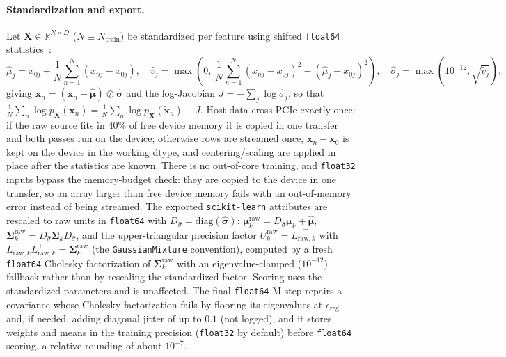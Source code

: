\documentclass[10pt]{article} %
\newcommand{\R}{\mathbb{R}}
\newcommand{\diag}{\mathrm{diag}}
\begin{document}
\paragraph{Standardization and export.} Let $\mathbf{X} \in \R^{N \times D}$ ($N \equiv N_{\mathrm{train}}$) be standardized per feature using shifted \texttt{float64} statistics~\citep{chan1983updating}:
\[
\hat{\mu}_j = x_{0j} + \frac{1}{N}\sum_{n=1}^N (x_{nj} - x_{0j}), \quad
\hat{v}_j = \max\!\left(0,\, \frac{1}{N}\sum_{n=1}^N (x_{nj} - x_{0j})^2 - (\hat{\mu}_j - x_{0j})^2\right), \quad
\hat{\sigma}_j = \max\!\left(10^{-12}, \sqrt{\hat{v}_j}\right),
\]
giving $\tilde{\mathbf{x}}_n = (\mathbf{x}_n - \hat{\boldsymbol{\mu}}) \oslash \hat{\boldsymbol{\sigma}}$ and the log-Jacobian $J = -\sum_{j} \log \hat{\sigma}_j$, so that $\frac{1}{N}\sum_n \log p_{\mathbf{X}}(\mathbf{x}_n) = \frac{1}{N}\sum_n \log p_{\tilde{\mathbf{X}}}(\tilde{\mathbf{x}}_n) + J$. Host data cross PCIe exactly once: if the raw source fits in $40\%$ of free device memory it is copied in one transfer and both passes run on the device; otherwise rows are streamed once, $\mathbf{x}_n - \mathbf{x}_0$ is kept on the device in the working dtype, and centering/scaling are applied in place after the statistics are known. There is no out-of-core training, and \texttt{float32} inputs bypass the memory-budget check: they are copied to the device in one transfer, so an array larger than free device memory fails with an out-of-memory error instead of being streamed. The exported \texttt{scikit-learn} attributes are rescaled to raw units in \texttt{float64} with $D_{\hat{\sigma}} = \diag(\hat{\boldsymbol{\sigma}})$: $\boldsymbol{\mu}_k^{\mathrm{raw}} = D_{\hat{\sigma}}\boldsymbol{\mu}_k + \hat{\boldsymbol{\mu}}$, $\boldsymbol{\Sigma}_k^{\mathrm{raw}} = D_{\hat{\sigma}}\boldsymbol{\Sigma}_k D_{\hat{\sigma}}$, and the upper-triangular precision factor $U_k^{\mathrm{raw}} = L_{\mathrm{raw},k}^{-\top}$ with $L_{\mathrm{raw},k}L_{\mathrm{raw},k}^\top = \boldsymbol{\Sigma}_k^{\mathrm{raw}}$ (the \texttt{GaussianMixture} convention), computed by a fresh \texttt{float64} Cholesky factorization of $\boldsymbol{\Sigma}_k^{\mathrm{raw}}$ with an eigenvalue-clamped ($10^{-12}$) fallback rather than by rescaling the standardized factor. Scoring uses the standardized parameters and is unaffected. The final \texttt{float64} M-step repairs a covariance whose Cholesky factorization fails by flooring its eigenvalues at $\epsilon_{\mathrm{reg}}$ and, if needed, adding diagonal jitter of up to $0.1$ (not logged), and it stores weights and means in the training precision (\texttt{float32} by default) before \texttt{float64} scoring, a relative rounding of about $10^{-7}$.
\end{document}

